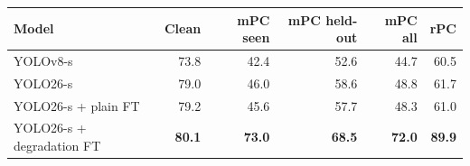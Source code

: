 \begin{tabular}{lrrrrr}
\toprule
Model & Clean & mPC seen & mPC held-out & mPC all & rPC \\
\midrule
YOLOv8-s & 73.8 & 42.4 & 52.6 & 44.7 & 60.5 \\
YOLO26-s & 79.0 & 46.0 & 58.6 & 48.8 & 61.7 \\
YOLO26-s + plain FT & 79.2 & 45.6 & 57.7 & 48.3 & 61.0 \\
YOLO26-s + degradation FT & \textbf{80.1} & \textbf{73.0} & \textbf{68.5} & \textbf{72.0} & \textbf{89.9} \\
\bottomrule
\end{tabular}

